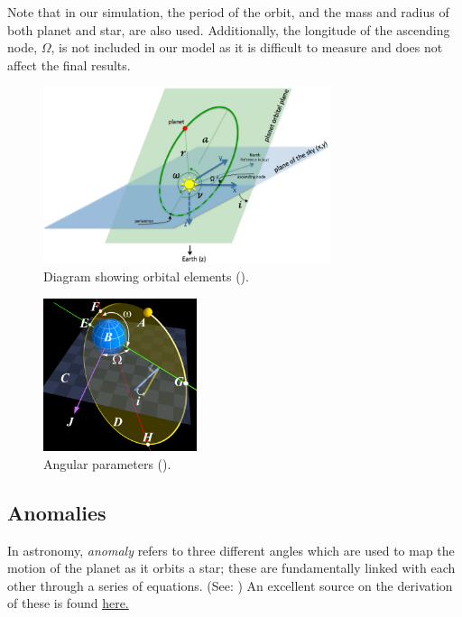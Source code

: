 \documentclass[11pt]{article}
\begin{document}
Note that in our simulation, the period of the orbit, and the mass and
radius of both planet and star, are also used. Additionally, the
longitude of the ascending node, \(\Omega\), is not included in our
model as it is difficult to measure and does not affect the final
results.

\quad

\begin{figure}[!ht]
	\centering 
	\includegraphics[width=0.75\textwidth]{../images/orbit_elements.png}
	\caption{Diagram showing orbital elements (\cite{Wikia}).} \label{Figure 2.a.i}
\end{figure}

\smallskip

\begin{figure}[H]
	\centering
	\includegraphics[width=0.4\textwidth]{../images/Angular_Parameters_of_Elliptical_Orbit.png}
	\caption{Angular parameters (\cite{Wikia}).} \label{Figure 2.a.ii}
\end{figure}

    \hypertarget{anomalies}{%
\subsection{Anomalies}\label{anomalies}}

In astronomy, \emph{anomaly} refers to three different angles which are used to map the motion of the planet as it orbits a star; these are
fundamentally linked with each other through a series of equations. (See: \cite{Reed}) An excellent source on the derivation of these is found \href{http://www.bogan.ca/orbits/kepler/e_anomly.html}{here.}
\end{document}
